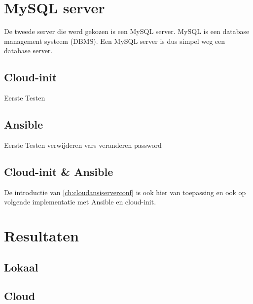 \section{MySQL server}
De tweede server die werd gekozen is een MySQL server. MySQL is een database management systeem (DBMS). Een MySQL server is dus simpel weg een database server.

\subsection{Cloud-init}
Eerste Testen

\subsection{Ansible}
Eerste Testen
verwijderen vars veranderen password

\subsection{Cloud-init \& Ansible}
De introductie van \ref*{ch:cloudansiserverconf} is ook hier van toepassing en ook op volgende implementatie met Ansible en cloud-init.

\section{Resultaten}

\subsection{Lokaal}

\subsection{Cloud}
